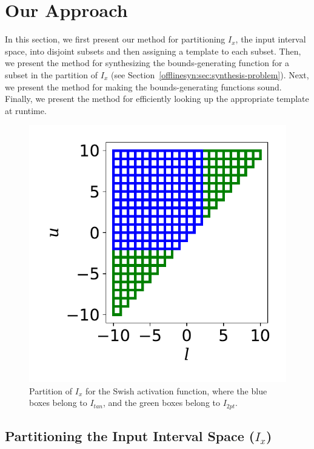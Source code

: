 \section{Our Approach}
\label{offlinesyn:sec:method-1}

In this section, we first present our method for partitioning $ I_x $,
the input interval space, into disjoint subsets and then assigning a
template to each subset. Then, we present the method for synthesizing
the bounds-generating function for a subset in the partition of
$I_x$ (see Section~\ref{offlinesyn:sec:synthesis-problem}).
Next, we present the method for making the bounds-generating
functions sound. Finally, we present the method for efficiently
looking up the appropriate template at runtime.

\begin{figure}[t]
	\centering
	\includegraphics[width=0.8\linewidth]{offlinesyn/figs/partition.pdf}
	\caption{Partition of $ I_x $ for the Swish activation function, where the blue boxes belong
	to $ I_{tan} $, and the green boxes belong to $ I_{2pt} $.
	\label{offlinesyn:fig:partition}}
\end{figure}

\subsection{Partitioning the Input Interval Space ($I_x$)}

